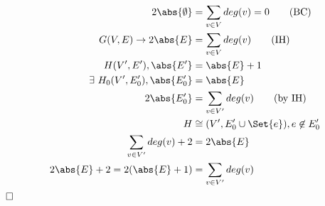 \label{ch2ex:11}
\begin{align}
  2\abs{\emptyset} &= \sum_{v \in V} deg(v) = 0 \tag{BC} \\
  G(V,E) \to 2\abs{E} &= \sum_{v \in V} deg(v) \tag{IH} \\
  H(V^{\prime}, E^{\prime}), \abs{E^{\prime}} &= \abs{E} + 1 \\
  \exists\ H_{0}(V^{\prime}, E^{\prime}_{0}), \abs{E^{\prime}_{0}} &= \abs{E} \\
  2\abs{E^{\prime}_{0}} &= \sum_{v \in V^{\prime}} deg(v) \tag{by IH}\\
  H &\cong (V^{\prime}, E_{0}^{\prime} \cup \Set{e}), e \not\in E_{0}^{\prime} \\
  \sum_{v \in V^{\prime}} deg(v) + 2 &= 2\abs{E} \\
  2\abs{E} + 2 = 2(\abs{E} + 1) &= \sum_{v \in V^{\prime}} deg(v)
\end{align}
$\hfill\square$
